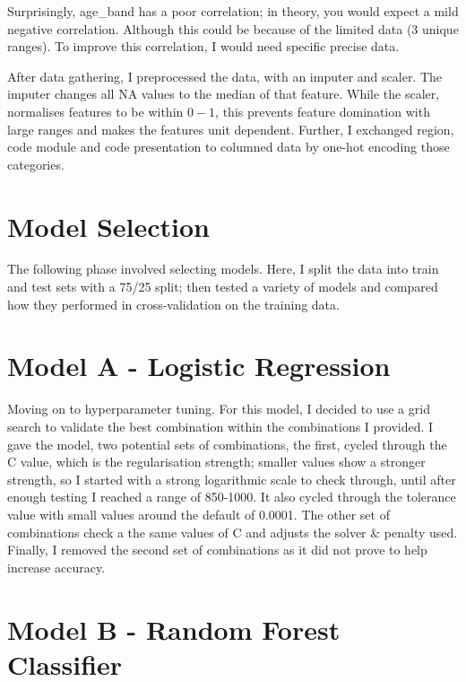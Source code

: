 \documentclass[11pt, a4paper, twocolumn]{article}
\begin{document}
Surprisingly, age\_band has a poor correlation; in theory, you would expect a mild negative correlation. Although this could be because of the limited data (3 unique ranges). To improve this correlation, I would need specific precise data.

After data gathering, I preprocessed the data, with an imputer and scaler. The imputer changes all NA values to the median of that feature. 
While the scaler, normalises features to be within $0-1$, this prevents feature domination with large ranges and makes the features unit dependent.
Further, I exchanged region, code module and code presentation to columned data by one-hot encoding those categories.

\section{Model Selection}

The following phase involved selecting models. Here, I split the data into train and test sets with a 75/25 split; then tested a variety of models and compared how they performed in cross-validation on the training data. 



\section{Model A - Logistic Regression}

Moving on to hyperparameter tuning. For this model, I decided to use a grid search to validate the best combination within the combinations I provided. 
I gave the model, two potential sets of combinations, the first, cycled through the C value, which is the regularisation strength; smaller values show a stronger strength, 
so I started with a strong logarithmic scale to check through, until after enough testing I reached a range of 850-1000. It also cycled through the tolerance value with small values around the default of 0.0001.
The other set of combinations check a the same values of C and adjusts the solver \& penalty used. Finally, I removed the second set of combinations as it did not prove to help increase accuracy.

\section{Model B - Random Forest Classifier}
\end{document}
